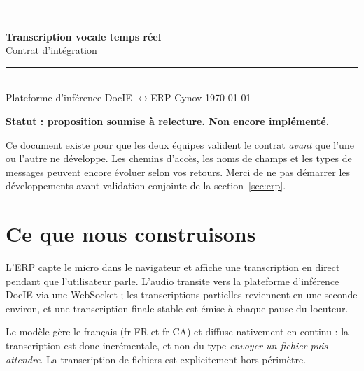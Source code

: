 \documentclass[11pt,a4paper]{article}
\begin{document}
\thispagestyle{empty}

\begin{flushleft}
{\color{accent}\rule{\textwidth}{2.2pt}}\\[1.1em]
{\Huge\bfseries Transcription vocale temps réel}\\[0.45em]
{\Large\color{muted} Contrat d'intégration}\\[1.1em]
{\color{hairline}\rule{\textwidth}{0.6pt}}\\[0.7em]
{\small\color{muted}
Plateforme d'inférence DocIE \quad$\longleftrightarrow$\quad ERP Cynov \hfill \today}
\end{flushleft}

\vspace{1.3em}

\begin{statusbox}
\textbf{Statut : proposition soumise à relecture. Non encore implémenté.}\par\smallskip
Ce document existe pour que les deux équipes valident le contrat \emph{avant} que l'une
ou l'autre ne développe. Les chemins d'accès, les noms de champs et les types de
messages peuvent encore évoluer selon vos retours. Merci de ne pas démarrer les
développements avant validation conjointe de la section~\ref{sec:erp}.
\end{statusbox}

\vspace{0.6em}

\section{Ce que nous construisons}

L'ERP capte le micro dans le navigateur et affiche une transcription en direct pendant
que l'utilisateur parle. L'audio transite vers la plateforme d'inférence DocIE via une
WebSocket ; les transcriptions partielles reviennent en une seconde environ, et une
transcription finale stable est émise à chaque pause du locuteur.

Le modèle gère le français (fr-FR et fr-CA) et diffuse nativement en continu : la
transcription est donc incrémentale, et non du type \emph{envoyer un fichier puis
attendre}. La transcription de fichiers est explicitement hors périmètre.
\end{document}
